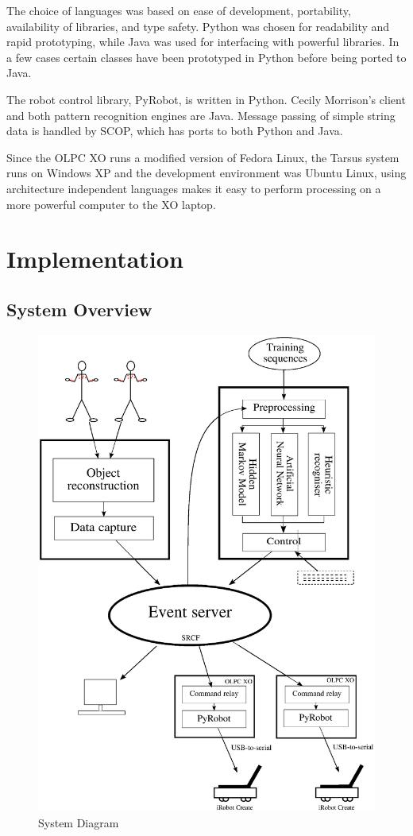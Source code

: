 \documentclass[12pt,a4,notitlepage]{report}
\renewcommand{\_}{\texttt{\symbol{95}}}
\newcommand{\<}{\texttt{\symbol{60}}}
\renewcommand{\>}{\texttt{\symbol{62}}}
\begin{document}
The choice of languages was based on ease of development, portability, availability of libraries, and type safety. Python was chosen for readability and rapid prototyping, while Java was used for interfacing with powerful libraries. In a few cases certain classes have been prototyped in Python before being ported to Java.

The robot control library, PyRobot, is written in Python. Cecily Morrison's client and both pattern recognition engines are Java. Message passing of simple string data is handled by SCOP, which has ports to both Python and Java.

Since the OLPC XO runs a modified version of Fedora Linux, the Tarsus system runs on Windows XP and the development environment was Ubuntu Linux, using architecture independent languages makes it easy to perform processing on a more powerful computer to the XO laptop.

\chapter{Implementation}

\section{System Overview}

\begin{figure}
\centering
\includegraphics[scale=0.6,angle=0]{diagrams/systemdiagram.ps}
\caption{System Diagram}
\label{sysdiag}
\end{figure}
\end{document}
